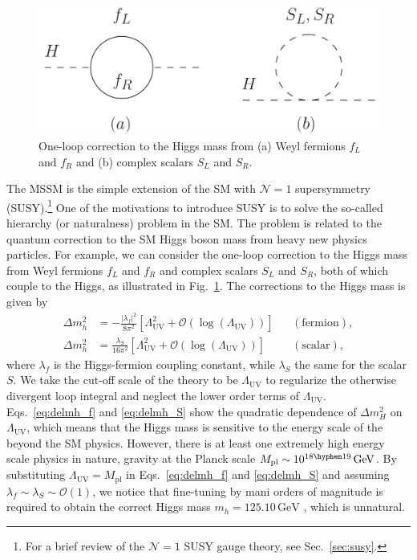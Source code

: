 \documentclass[12pt,twoside,book]{article}
\begin{document}
\begin{figure}[b]
  \centering
  \includegraphics[width=0.6\hsize]{loop_correction.pdf}
  \caption{One-loop correction to the Higgs mass from (a) Weyl fermions $f_L$ and $f_R$ and (b) complex scalars $S_L$ and $S_R$.}
  \label{fig:loop_correction}
\end{figure}

The MSSM is the simple extension of the SM with $\mathcal{N} = 1$ supersymmetry (SUSY).\footnote
{
  For a brief review of the $\mathcal{N} = 1$ SUSY gauge theory, see Sec.~\ref{sec:susy}.
}
One of the motivations to introduce SUSY is to solve the so-called hierarchy (or naturalness) problem \cite{Weinberg:1975gm,Gildener:1976ai,Susskind:1978ms} in the SM.
The problem is related to the quantum correction to the SM Higgs boson mass from heavy new physics particles.
For example, we can consider the one-loop correction to the Higgs mass from Weyl fermions $f_L$ and $f_R$ and complex scalars $S_L$ and $S_R$, both of which couple to the Higgs, as illustrated in Fig.~\ref{fig:loop_correction}.
The corrections to the Higgs mass is given by
\begin{align}
  \Delta m_h^2 &= -\frac{|\lambda_f|^2}{8 \pi^2} \left[
  \Lambda_{\mathrm{UV}}^2 + \mathcal{O} (\log(\Lambda_{\mathrm{UV}})) \right] & &\mathrm{(fermion)}, \label{eq:delmh_f}\\
  \Delta m_h^2 &= \frac{\lambda_S}{16 \pi^2} \left[
  \Lambda_{\mathrm{UV}}^2 + \mathcal{O} (\log(\Lambda_{\mathrm{UV}})) \right] & &\mathrm{(scalar)}, \label{eq:delmh_S}
\end{align}
where $\lambda_f$ is the Higgs-fermion coupling constant, while $\lambda_S$ the same for the scalar $S$.
We take the cut-off scale of the theory to be $\Lambda_{\mathrm{UV}}$ to regularize the otherwise divergent loop integral and neglect the lower order terms of $\Lambda_{\mathrm{UV}}$.
Eqs.~\eqref{eq:delmh_f} and \eqref{eq:delmh_S} show the quadratic dependence of $\Delta m_H^2$ on $\Lambda_{\mathrm{UV}}$, which means that the Higgs mass is sensitive to the energy scale of the beyond the SM physics.
However, there is at least one extremely high energy scale physics in nature, gravity at the Planck scale $M_{\mathrm{pl}} \sim 10^{18 \hyphen 19}\,\mathrm{GeV}$.
By substituting $\Lambda_{\mathrm{UV}} = M_{\mathrm{pl}}$ in Eqs.~\eqref{eq:delmh_f} and \eqref{eq:delmh_S} and assuming $\lambda_f \sim \lambda_S \sim \mathcal{O} (1)$, we notice that fine-tuning by mani orders of magnitude is required to obtain the correct Higgs mass $m_h = 125.10\,\mathrm{GeV}$ \cite{Tanabashi:2018oca}, which is unnatural.
\end{document}
